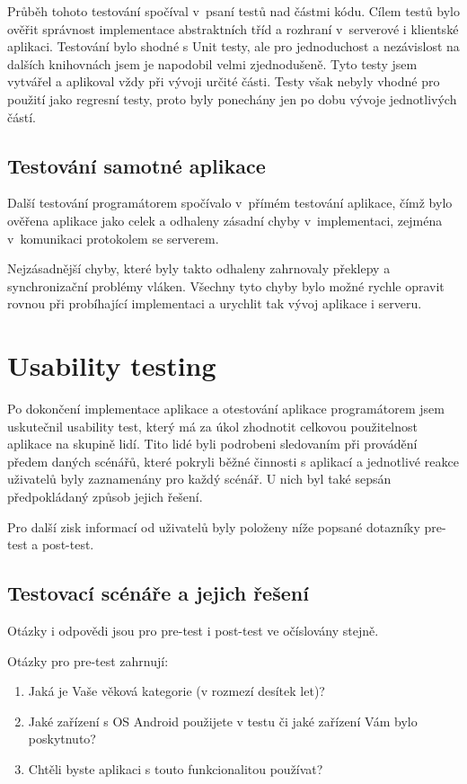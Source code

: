 \documentclass[thesis=B,czech]{FITthesis}[2013/10/20]
\begin{document}
Průběh tohoto testování spočíval v~psaní testů nad částmi kódu. Cílem testů bylo ověřit správnost implementace abstraktních tříd a rozhraní v~serverové i klientské aplikaci. Testování bylo shodné s Unit testy, ale pro jednoduchost a nezávislost na dalších knihovnách jsem je napodobil velmi zjednodušeně. Tyto testy jsem vytvářel a aplikoval vždy při vývoji určité části. Testy však nebyly vhodné pro použití jako regresní testy, proto byly ponechány jen po dobu vývoje jednotlivých částí.

\subsection{Testování samotné aplikace}

Další testování programátorem spočívalo v~přímém testování aplikace, čímž bylo ověřena aplikace jako celek a odhaleny zásadní chyby v~implementaci, zejména v~komunikaci protokolem se serverem.

Nejzásadnější chyby, které byly takto odhaleny zahrnovaly překlepy a synchronizační problémy vláken. Všechny tyto chyby bylo možné rychle opravit rovnou při probíhající implementaci a urychlit tak vývoj aplikace i serveru.

\section{Usability testing}

Po dokončení implementace aplikace a otestování aplikace programátorem jsem uskutečnil usability test, který má za úkol zhodnotit celkovou použitelnost aplikace na skupině lidí. Tito lidé byli podrobeni sledovaním při provádění předem daných scénářů, které pokryli běžné činnosti s aplikací a jednotlivé reakce uživatelů byly zaznamenány pro každý scénář. U nich byl také sepsán předpokládaný způsob jejich řešení.

Pro další zisk informací od uživatelů byly položeny níže popsané dotazníky pre-test a post-test.

\subsection{Testovací scénáře a jejich řešení}

Otázky i odpovědi jsou pro pre-test i post-test ve očíslovány stejně.

Otázky pro pre-test zahrnují:
\begin{enumerate}
  \item Jaká je Vaše věková kategorie (v rozmezí desítek let)?
  \item Jaké zařízení s OS Android použijete v testu či jaké zařízení Vám bylo poskytnuto?
  \item Chtěli byste aplikaci s touto funkcionalitou používat?
\end{enumerate}
\end{document}
